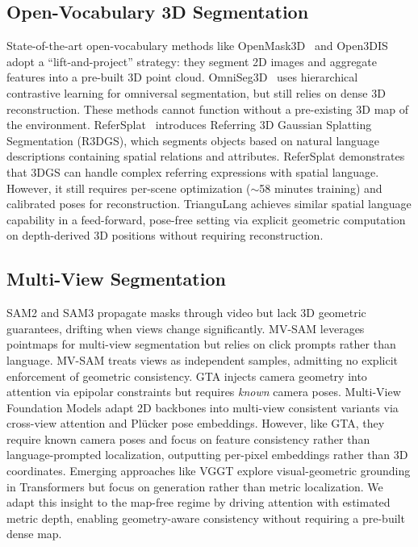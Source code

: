 
\subsection{Open-Vocabulary 3D Segmentation}
State-of-the-art open-vocabulary methods like OpenMask3D~\cite{openmask3d} and Open3DIS~\cite{open3dis} adopt a ``lift-and-project'' strategy: they segment 2D images and aggregate features into a pre-built 3D point cloud. OmniSeg3D~\cite{omniseg3d} uses hierarchical contrastive learning for omniversal segmentation, but still relies on dense 3D reconstruction. These methods cannot function without a pre-existing 3D map of the environment. ReferSplat~\cite{refersplat} introduces Referring 3D Gaussian Splatting Segmentation (R3DGS), which segments objects based on natural language descriptions containing spatial relations and attributes. ReferSplat demonstrates that 3DGS can handle complex referring expressions with spatial language. However, it still requires per-scene optimization ($\sim$58 minutes training) and calibrated poses for reconstruction. TrianguLang achieves similar spatial language capability in a feed-forward, pose-free setting via explicit geometric computation on depth-derived 3D positions without requiring reconstruction.



\subsection{Multi-View Segmentation}
SAM2 and SAM3 \cite{sam2,sam3} propagate masks through video but lack 3D geometric guarantees, drifting when views change significantly. MV-SAM  \cite{mvsam} leverages pointmaps for multi-view segmentation but relies on click prompts rather than language. MV-SAM treats views as independent samples, admitting no explicit enforcement of geometric consistency. GTA \cite{GTA} injects camera geometry into attention via epipolar constraints but requires \textit{known} camera poses. Multi-View Foundation Models \cite{mvfoundation} adapt 2D backbones into multi-view consistent variants via cross-view attention and Pl\"ucker pose embeddings. However, like GTA, they require known camera poses and focus on feature consistency rather than language-prompted localization, outputting per-pixel embeddings rather than 3D coordinates. Emerging approaches like VGGT \cite{VGGT} explore visual-geometric grounding in Transformers but focus on generation rather than metric localization. We adapt this insight to the map-free regime by driving attention with estimated metric depth, enabling geometry-aware consistency without requiring a pre-built dense map.



